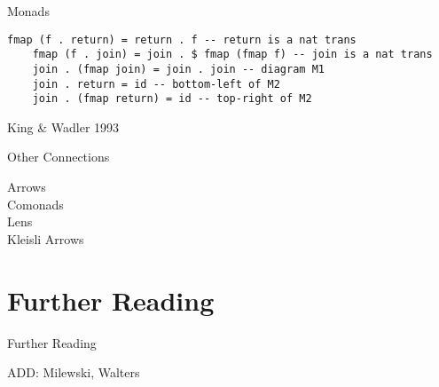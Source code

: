 \documentclass[10pt]{beamer}
\theoremstyle{definition}
\theoremstyle{remark}
\numberwithin{equation}{section}
\begin{document}
\begin{frame}[fragile]{Monads}
  
  \begin{lstlisting}[frame=single]
    fmap (f . return) = return . f -- return is a nat trans
    fmap (f . join) = join . $ fmap (fmap f) -- join is a nat trans
    join . (fmap join) = join . join -- diagram M1
    join . return = id -- bottom-left of M2
    join . (fmap return) = id -- top-right of M2
  \end{lstlisting}

  {\small King \& Wadler 1993}
  
\end{frame}

\begin{frame}[fragile]{Other Connections}
  \begin{description}
  \item[Arrows] 
  \item[Comonads] 
  \item[Lens] 
  \item[Kleisli Arrows] 
  \end{description}
\end{frame}

\section{Further Reading}

\begin{frame}[fragile]{Further Reading}

  ADD: Milewski, Walters
  
  \nocite{elkins_calculating_2009}
  
  

\end{frame}
\end{document}
